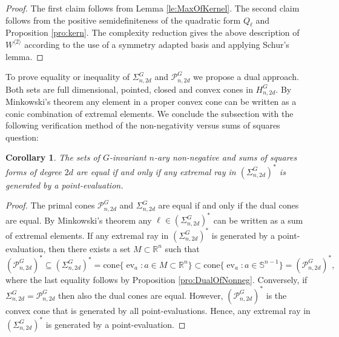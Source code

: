 \documentclass[11pt,a4paper]{amsart}
\numberwithin{equation}{section}
\newtheorem{cor}[thm]{Corollary}
\theoremstyle{definition}
\newcommand{\R}{\mathbb{R}}
\DeclareMathOperator{\ev}{ev}
\numberwithin{thm}{section}
\theoremstyle{break}
\numberwithin{subcase}{case}
\begin{document}
\begin{proof}
The first claim follows from Lemma \ref{le:MaxOfKernel}.
The second claim follows from the positive semidefiniteness of the quadratic form $Q_\ell$ and Proposition \ref{pro:kern}. The complexity reduction gives the above description of $W^{\langle 2 \rangle}$ according to the use of a symmetry adapted basis and applying Schur's lemma. 
\end{proof}
To prove equality or inequality of $\Sigma_{n,2d}^G$ and $\mathcal{P}_{n,2d}^G$ we propose a dual approach. Both sets are full dimensional, pointed, closed and convex cones in $H_{n,2d}^G$. By Minkowski's theorem any element in a proper convex cone can be written as a conic combination of extremal elements. We conclude the subsection with the following verification method of the non-negativity versus sums of squares question:
\begin{cor}\label{cor:Sigma=P}
The sets of $G$-invariant $n$-ary non-negative and sums of squares forms of degree $2d$ are equal if and only if any extremal ray in $\left( \Sigma_{n,2d}^G\right)^\ast$ is generated by a point-evaluation. 
\end{cor}
\begin{proof}
The primal cones $\mathcal{P}_{n,2d}^G$ and $\Sigma_{n,2d}^G$ are equal if and only if the dual cones are equal. By Minkowski's theorem any $ \ell \in \left( \Sigma_{n,2d}^G \right)^\ast$ can be written as a sum of extremal elements. If any extremal ray in $\left( \Sigma_{n,2d}^G\right)^\ast$ is generated by a point-evaluation, then there exists a set $M \subset \R^n$ such that $$ \left( \mathcal{P}_{n,2d}^G \right)^\ast \subseteq \left( \Sigma_{n,2d}^G \right)^\ast= \mbox{cone}\{\ev_{a} : a \in M \subset \R^n\} \subset \mbox{cone}\{ \ev_a : a \in \mathbb{S}^{n-1}\} = \left( \mathcal{P}_{n,2d}^G \right)^\ast,$$ where the last equality follows by Proposition \ref{pro:DualOfNonneg}. Conversely, if $\Sigma_{n,2d}^G = \mathcal{P}_{n,2d}^G$ then also the dual cones are equal. However, $\left( \mathcal{P}_{n,2d}^G \right)^\ast$ is the convex cone that is generated by all point-evaluations. Hence, any extremal ray in $\left( \Sigma_{n,2d}^G\right)^\ast$ is generated by a point-evaluation.
\end{proof}
\end{document}
